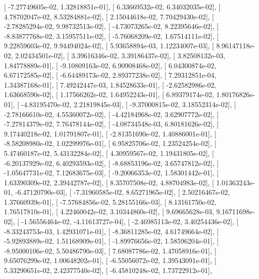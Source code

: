 \documentclass{article}
\begin{document}
       [ -7.27749605e-02,   1.32818851e-01],
       [  6.33669532e-02,   6.34032035e-02],
       [  4.78702047e-02,   8.53284881e-02],
       [  2.15044618e-02,   7.70429430e-02],
       [ -2.78285294e-02,   9.98732513e-02],
       [ -4.73073265e-02,   8.22395646e-02],
       [ -8.83877768e-02,   3.15957511e-02],
       [ -5.76068209e-02,   1.67514111e-02],
       [  9.22859603e-02,   9.94494024e-02],
       [  5.93658894e-03,   1.12234007e-03],
       [  8.96147118e-02,   2.02434501e-02],
       [  3.39616346e-02,   3.39186437e-02],
       [  3.82508132e-03,   1.84778889e-01],
       [ -9.10809163e-02,   6.90908468e-02],
       [  6.04300874e-02,   6.67172585e-02],
       [ -6.64489173e-02,   2.89377238e-02],
       [  7.29312851e-04,   1.34387168e-01],
       [  7.49242447e-03,   1.84528633e-01],
       [ -2.62582986e-02,   1.63668590e-02],
       [  1.17566262e-02,   1.64952243e-01],
       [  6.89379174e-02,   1.80176826e-01],
       [ -4.83195470e-02,   2.21819845e-03],
       [ -9.37000815e-02,   3.18552314e-02],
       [ -2.78166610e-02,   4.55360072e-02],
       [ -4.42184968e-02,   3.62907772e-02],
       [ -7.27814379e-02,   7.76478144e-02],
       [ -4.08734548e-03,   6.80181626e-02],
       [  9.17440218e-02,   1.01791807e-01],
       [ -2.81351690e-02,   1.40886001e-01],
       [ -8.58208980e-02,   1.02299976e-01],
       [  6.95825706e-02,   1.23524254e-02],
       [  5.47460187e-02,   5.43132284e-02],
       [  4.30959567e-02,   1.19431805e-02],
       [ -6.20137929e-02,   6.40293593e-02],
       [ -8.68853196e-02,   3.65747812e-02],
       [ -1.05647731e-02,   7.12683675e-03],
       [ -9.20066353e-02,   1.58301442e-01],
       [  1.63390309e-02,   2.39442787e-02],
       [  8.35707508e-02,   4.88704983e-02],
       [  1.01363243e-01,  -6.47120790e-03],
       [ -7.31960585e-02,   8.65271965e-02],
       [  2.50216467e-02,   1.37660939e-01],
       [ -7.57684856e-02,   5.28155166e-03],
       [  8.13161750e-02,   1.76517810e-01],
       [  4.22460042e-02,   3.10344860e-02],
       [  9.69665628e-03,   9.16711698e-02],
       [ -1.56556464e-02,  -4.11613727e-04],
       [ -2.46985113e-02,   3.40254436e-02],
       [ -8.33243753e-03,   1.42931071e-01],
       [ -8.36811285e-02,   4.61749664e-02],
       [ -5.92893889e-02,   1.51168909e-01],
       [ -1.89976656e-02,   1.58596204e-01],
       [ -8.95000106e-02,   5.50486790e-03],
       [  7.68087786e-02,   1.47058916e-01],
       [  9.65076299e-02,   1.00648202e-01],
       [ -6.55056072e-02,   1.39543091e-01],
       [  5.33290651e-02,   2.42377540e-02],
       [ -6.45810248e-02,   1.73722912e-01],
\end{document}
